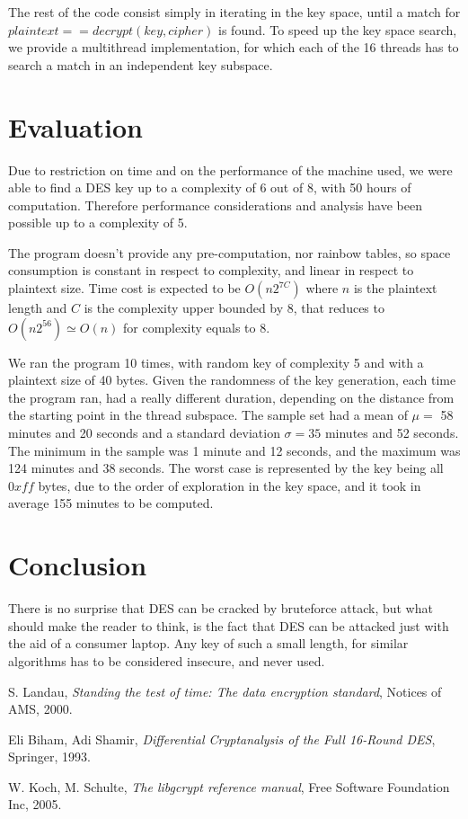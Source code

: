 \documentclass[11pt]{article}
\begin{document}
  The rest of the code consist simply in iterating in the key space, until a match for $plaintext == decrypt(key, cipher)$ is found.
  To speed up the key space search, we provide a multithread implementation, for which each of the 16 threads has to search a match in an independent key subspace.

  \section{Evaluation}
  Due to restriction on time and on the performance of the machine used, we were able to find a DES key up to a complexity of 6 out of 8, with 50 hours of computation. Therefore performance considerations and analysis have been possible up to a complexity of 5.

  The program doesn't provide any pre-computation, nor rainbow tables, so space consumption is constant in respect to complexity, and linear in respect to plaintext size.
  Time cost is expected to be $O(n2^{7C})$ where $n$ is the plaintext length and $C$ is the complexity upper bounded by 8, that reduces to $O(n2^{56})\simeq O(n)$ for complexity equals to 8.

  We ran the program 10 times, with random key of complexity 5 and with a plaintext size of 40 bytes. Given the randomness of the key generation, each time the program ran, had a really different duration, depending on the distance from the starting point in the thread subspace. The sample set had a mean of $\mu =$  58 minutes and 20 seconds and a standard deviation $\sigma = 35$ minutes and 52 seconds. The minimum in the sample was 1 minute and 12 seconds, and the maximum was 124 minutes and 38 seconds. The worst case is represented by the key being all $0xff$ bytes, due to the order of exploration in the key space, and it took in average 155 minutes to be computed.

  \section{Conclusion}
  There is no surprise that DES can be cracked by bruteforce attack, but what should make the reader to think, is the fact that DES can be attacked just with the aid of a consumer laptop. Any key of such a small length, for similar algorithms has to be considered insecure, and never used.





  \begin{thebibliography}{99}

      S. Landau,
      \textit{Standing the test of time: The data encryption standard},
      Notices of AMS,
      2000.

      Eli Biham, Adi Shamir,
      \textit{Differential Cryptanalysis of the Full 16-Round DES},
      Springer,
      1993.

      W. Koch, M. Schulte,
      \textit{The libgcrypt reference manual},
      Free Software Foundation Inc,
      2005.



  \end{thebibliography}
\end{document}
